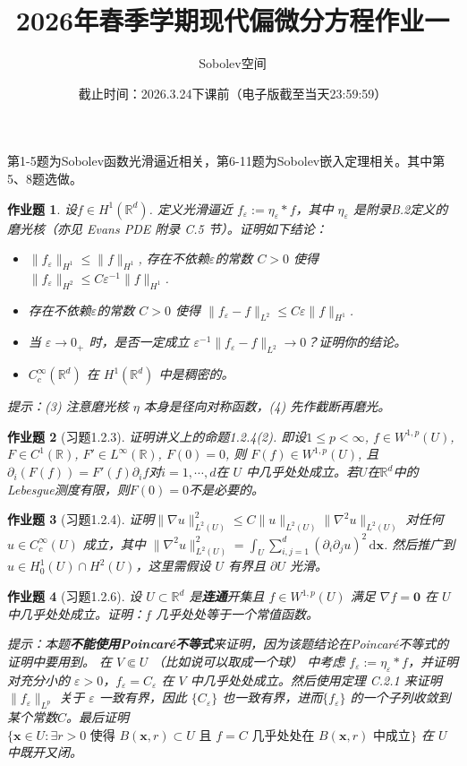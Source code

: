 \documentclass[UTF8,fontset=windows,12pt]{ctexart}
\theoremstyle{kaiti-theorem}
\newtheorem{problem}{作业题}
\numberwithin{equation}{section}
\newcommand{\R}{\mathbb{R}}
\newcommand{\bd}[1]{\mathbf{#1}}  %
\newcommand{\bds}[1]{\boldsymbol{#1}}  %
\newcommand{\p}{\partial}
\newcommand{\nab}{\nabla}
\newcommand{\dxx}{\,\mathrm{d}\bds{x}}
\newcommand{\iu}{\int_{U}}
\newcommand{\eps}{\varepsilon}
\newcommand{\xx}{{\bds{x}}}
\begin{document}
\title{\LARGE{\bf  2026年春季学期现代偏微分方程作业一}}
\author{Sobolev空间}
\date{截止时间：2026.3.24下课前（电子版截至当天23:59:59）}

\maketitle

第1-5题为Sobolev函数光滑逼近相关，第6-11题为Sobolev嵌入定理相关。其中第5、8题选做。

\begin{problem}
设$f\in H^1(\R^d)$. 定义光滑逼近 $f_\eps:=\eta_\eps*f$，其中 $\eta_\eps$ 是附录B.2定义的磨光核（亦见 Evans PDE 附录 C.5 节）。证明如下结论：
\begin{itemize}
\item [(1)] $\|f_\eps\|_{H^1}\leqslant \|f\|_{H^1}$, 存在不依赖$\eps$的常数 $C>0$ 使得 $\|f_\eps\|_{H^{2}}\leqslant C\eps^{-1}\|f\|_{H^1}$.
\item [(2)] 存在不依赖$\eps$的常数 $C>0$ 使得 $\|f_\eps - f\|_{L^2}\leqslant C\eps\|f\|_{H^1}$.
\item [(3)] 当 $\eps\to 0_+$ 时，是否一定成立 $\eps^{-1}\|f_\eps - f\|_{L^2}\to 0$？证明你的结论。
\item [(4)] $C_c^\infty(\R^d)$ 在 $H^1(\R^d)$ 中是稠密的。
\end{itemize}
提示：(3) 注意磨光核 $\eta$ 本身是径向对称函数，(4) 先作截断再磨光。
\end{problem}


\begin{problem}[习题1.2.3] 证明讲义上的命题1.2.4(2). 即设$1\leqslant p<\infty$, $f\in W^{1,p}(U)$, $F\in C^1(\R)$, $F'\in L^{\infty}(\R)$, $F(0)=0$, 则 $F(f)\in W^{1,p}(U)$, 且 $\p_i(F(f))=F'(f)\p_i f$对$i=1,\cdots,d$在 $U$ 中几乎处处成立。若$U$在$\R^d$中的Lebesgue测度有限，则$F(0)=0$不是必要的。
\end{problem}

\begin{problem}[习题1.2.4]
证明$\|\nab u\|_{L^2(U)}^2\leqslant C\|u\|_{L^2(U)}\|\nab^2 u\|_{L^2(U)}$  对任何 $u\in C_c^{\infty}(U)$ 成立，其中 $\|\nab^2 u\|_{L^2(U)}^2=\iu\sum\limits_{i,j=1}^d(\p_i\p_j u)^2\dxx$. 然后推广到 $u\in H_0^1(U)\cap H^2(U)$，这里需假设 $U$ 有界且 $\p U$ 光滑。
\end{problem}

\begin{problem}[习题1.2.6]
设 $U\subset\R^d$ 是\textbf{连通}开集且 $f\in W^{1,p}(U)$ 满足 $\nab f=\bd{0}$ 在 $U$ 中几乎处处成立。证明：$f$ 几乎处处等于一个常值函数。

提示：本题\textbf{不能使用Poincar\'e不等式}来证明，因为该题结论在Poincar\'e不等式的证明中要用到。 在 $V\Subset U$ （比如说可以取成一个球） 中考虑 $f_\eps:=\eta_\eps*f$，并证明对充分小的 $\eps>0$，$f_\eps=C_\eps$ 在 $V$ 中几乎处处成立。然后使用定理 C.2.1 来证明 $\|f_\eps\|_{L^p}$ 关于 $\eps$ 一致有界，因此 $\{C_\eps\}$ 也一致有界，进而$\{f_\eps\}$ 的一个子列收敛到某个常数$C$。最后证明 $\{ \xx \in U : \exists r > 0 \text{ 使得 } B(\xx, r) \subset U \text{ 且 } f = C\text{ 几乎处处在 } B(\xx, r) \text{ 中成立} \}$ 在 $U$ 中既开又闭。
\end{problem}
\end{document}
